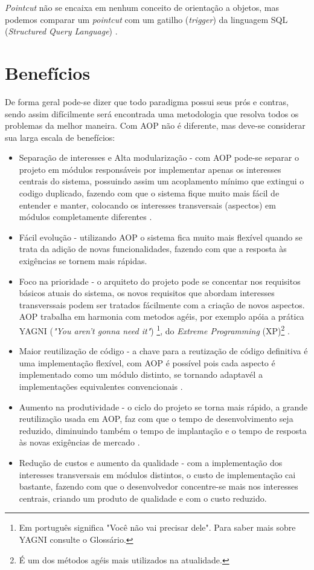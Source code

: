\documentclass[tc,openright]{iiufrgs}
\begin{document}
\textit{Pointcut} não se encaixa em nenhum conceito de orientação a objetos, mas podemos comparar um \textit{pointcut} com um gatilho (\textit{trigger}) da linguagem SQL (\textit{Structured Query Language}) \cite{jacobson2004aspect}.

\section{Benefícios}

De forma geral pode-se dizer que todo paradigma possui seus prós e contras, sendo assim difícilmente será encontrada uma metodologia que resolva todos os problemas da melhor maneira. Com AOP não é diferente, mas deve-se considerar sua larga escala de benefícios:

\begin{itemize}
\item Separação de interesses e Alta modularização - com AOP pode-se separar o projeto em módulos responsáveis por implementar apenas os interesses centrais do sistema, possuindo assim um acoplamento mínimo que extingui o codigo duplicado, fazendo com que o sistema fique muito mais fácil de entender e manter, colocando os interesses transversais (aspectos) em módulos completamente diferentes \cite{laddad2003aspectj}.
\item Fácil evolução - utilizando AOP o sistema fica muito mais flexível quando se trata da adição de novas funcionalidades, fazendo com que a resposta às exigências se tornem mais rápidas.
\item Foco na prioridade - o arquiteto do projeto pode se concentar nos requisitos básicos atuais do sistema, os novos requisitos que abordam interesses transverssais podem ser tratados fácilmente com a criação de novos aspectos. AOP trabalha em harmonia com metodos agéis, por exemplo apóia a prática YAGNI (\textit{"You aren’t gonna need it"}) \footnote{Em português significa "Você não vai precisar dele". Para saber mais sobre YAGNI consulte o Glossário.}, do \textit{Extreme Programming} (XP)\footnote{É um dos métodos agéis mais utilizados na atualidade.} \cite{laddad2003aspectj}.
\item Maior reutilização de código - a chave para a reutização de código definitiva é uma implementação flexível, com AOP é possível pois cada aspecto é implementado como um módulo distinto, se tornando adaptavél a implementações equivalentes convencionais \cite{laddad2003aspectj}. 
\item Aumento na produtividade - o ciclo do projeto se torna mais rápido, a grande reutilização usada em AOP, faz com que o tempo de desenvolvimento seja reduzido, diminuindo também o tempo de implantação e o tempo de resposta às novas exigências de mercado \cite{laddad2003aspectj}. 
\item Redução de custos e aumento da qualidade - com a implementação dos interesses transversais em módulos distintos, o custo de implementação cai bastante, fazendo com que o desenvolvedor concentre-se mais nos interesses centrais, criando um produto de qualidade e com o custo reduzido.
\end{itemize}
\end{document}

